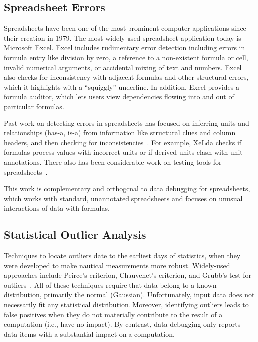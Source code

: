 \subsection*{Spreadsheet Errors}

Spreadsheets have been one of the most prominent computer applications
since their creation in 1979.
 The most widely used spreadsheet application today is Microsoft
Excel. Excel includes rudimentary error detection including errors in
formula entry like division by zero, a reference to a non-existent
formula or cell, invalid numerical arguments, or accidental mixing of
text and numbers.
Excel also checks for inconsistency with adjacent formulas and other
structural errors, which it highlights with a ``squiggly'' underline. In addition, Excel provides a formula auditor, which lets users view dependencies flowing into and out of particular formulas.

Past work on detecting errors in spreadsheets has focused on inferring
units and relationships (has-a, is-a) from information like structural
clues and column
headers, and then checking for inconsistencies~\cite{Antoniu:2004:VUC:998675.999448,DBLP:conf/kbse/AhmadAGK03,Chambers:2010:RSL:1860134.1860346,Erwig:2009:SES:1608570.1608694,Erwig:2005:AGM:1062455.1062494}. For
example, XeLda checks if formulas process values with incorrect units
or if derived units clash with unit annotations. There also has been
considerable work on testing tools for
spreadsheets~\cite{fisher2006scaling,rothermel1998you,rothermel2001methodology,Carver:2006:EET:1159733.1159775}.

This work is complementary and orthogonal to data debugging for spreadsheets, which
works with standard, unannotated spreadsheets and focuses on unusual
interactions of data with formulas.



\subsection*{Statistical Outlier Analysis}

Techniques to locate outliers date to the earliest days of statistics,
when they were developed to make nautical measurements more
robust. Widely-used approaches include Peirce's criterion, Chauvenet's
criterion, and Grubb's test for
outliers~\cite{barnett1994outliers}. All of these techniques require
that data belong to a known distribution, primarily the normal
(Gaussian). Unfortunately, input data does not necessarily fit any
statistical distribution. Moreover, identifying outliers leads to
false positives when they do not materially contribute to the result
of a computation (i.e., have no impact). By contrast, data debugging only reports
data items with a substantial impact on a computation.


